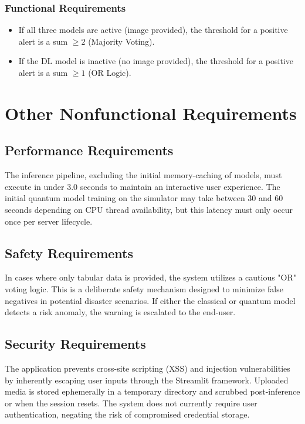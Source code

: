 \documentclass[conference]{IEEEtran}
\begin{document}
\subsubsection{Functional Requirements}
\begin{itemize}
    \item If all three models are active (image provided), the threshold for a positive alert is a sum $\geq 2$ (Majority Voting).
    \item If the DL model is inactive (no image provided), the threshold for a positive alert is a sum $\geq 1$ (OR Logic).
\end{itemize}

\section{Other Nonfunctional Requirements}
\subsection{Performance Requirements}
The inference pipeline, excluding the initial memory-caching of models, must execute in under 3.0 seconds to maintain an interactive user experience. The initial quantum model training on the simulator may take between 30 and 60 seconds depending on CPU thread availability, but this latency must only occur once per server lifecycle.

\subsection{Safety Requirements}
In cases where only tabular data is provided, the system utilizes a cautious "OR" voting logic. This is a deliberate safety mechanism designed to minimize false negatives in potential disaster scenarios. If either the classical or quantum model detects a risk anomaly, the warning is escalated to the end-user.

\subsection{Security Requirements}
The application prevents cross-site scripting (XSS) and injection vulnerabilities by inherently escaping user inputs through the Streamlit framework. Uploaded media is stored ephemerally in a temporary directory and scrubbed post-inference or when the session resets. The system does not currently require user authentication, negating the risk of compromised credential storage.
\end{document}
